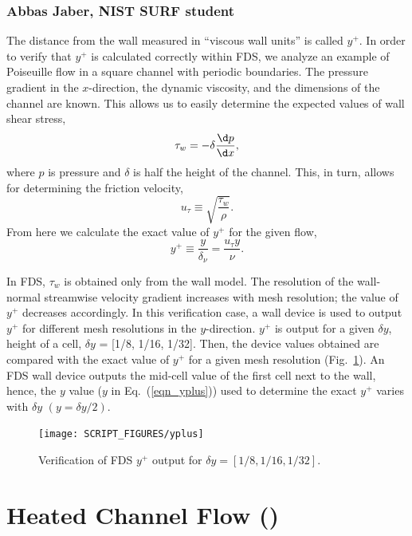 \documentclass[11pt]{book}
\begin{document}
\subsubsection{Abbas Jaber, NIST SURF student}

\noindent The distance from the wall measured in ``viscous wall units'' is called $y^+$. In order to verify that $y^+$ is calculated correctly within FDS, we analyze an example of Poiseuille flow in a square channel with periodic boundaries. The pressure gradient in the $x$-direction, the dynamic viscosity, and the dimensions of the channel are known. This allows us to easily determine the expected values of wall shear stress,
\begin{equation}
\label{wall stress}
\tau_w = - \delta \frac{\d p}{\d x},
\end{equation}
where $p$ is pressure and $\delta$ is half the height of the channel. This, in turn, allows for determining the friction velocity,
\begin{equation}
\label{friction velocity}
u_{\tau} \equiv \sqrt{{\frac{\tau_w}{\rho}}}.
\end{equation}
From here we calculate the exact value of $y^+$ for the given flow,
\begin{equation}
\label{eqn_yplus}
y^+ \equiv \frac{y}{\delta_{\nu}} = \frac{u_{\tau}y}{\nu}.
\end{equation}

In FDS, $\tau_w$ is obtained only from the wall model. The resolution of the wall-normal streamwise velocity gradient increases with  mesh resolution; the value of $y^+$ decreases accordingly. In this verification case, a wall device is used to output $y^+$ for different mesh resolutions in the $y$-direction. $y^+$ is output for a given $\delta y$, height of a cell, $\delta y$ = [1/8, 1/16, 1/32]. Then, the device values obtained are compared with the exact value of $y^+$ for a given mesh resolution (Fig.~\ref{fig_yplus}). An FDS wall device outputs the mid-cell value of the first cell next to the wall, hence, the $y$ value ($y$ in Eq.~(\ref{eqn_yplus})) used to determine the exact $y^+$ varies with $\delta y$ $(y = \delta y/2)$.

\begin{figure}[ht]
\centering
\texttt{[image: SCRIPT\_FIGURES/yplus]}
\caption[Near-wall grid resolution]{Verification of FDS $y^+$ output for $\delta y=[1/8, 1/16, 1/32]$.}
\label{fig_yplus}
\end{figure}


\section{Heated Channel Flow (\texorpdfstring{}{heated\_channel})}
\end{document}
